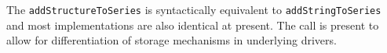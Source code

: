 The \verb+addStructureToSeries+ is syntactically equivalent to \verb+addStringToSeries+ and most
implementations are also identical at present. The call is present to allow for differentiation of
storage mechanisms in underlying drivers.
